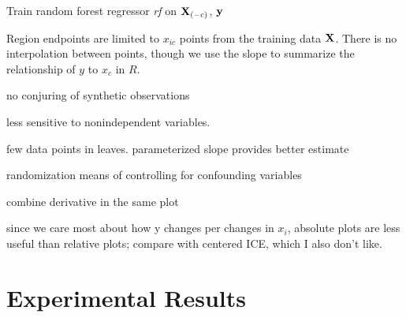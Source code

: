 \documentclass[12pt]{article}
\begin{document}
\setlength{\algomargin}{5pt}
\begin{algorithm}[H]
\label{alg:CatStratPD}
\LinesNumbered
{}
\SetAlgoSkip{}
\SetInd{.5em}{.5em}
Train random forest regressor {\it rf} on ${\bf X}_{(-c)}$, $\bf y$\\
\end{algorithm}




Region endpoints are limited to $x_{ic}$ points from the training data $\bf X$.  There is no interpolation between points, though we use the slope to summarize the relationship of $y$ to $x_c$ in $R$.

no conjuring of synthetic observations

less sensitive to nonindependent variables.
 
few data points in leaves. parameterized slope provides better estimate

randomization means of controlling for confounding variables

combine derivative in the same plot

since we care most about how y changes per changes in $x_i$, absolute plots are less useful than relative plots; compare with centered ICE, which I also don't like.

\section{Experimental Results}
\end{document}
